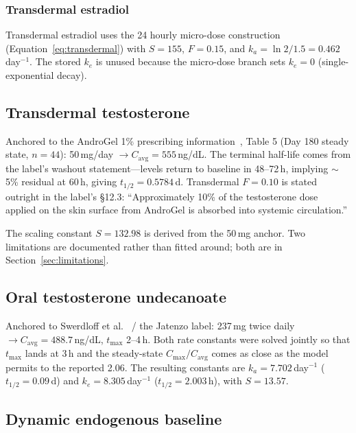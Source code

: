 \documentclass[11pt,a4paper]{article}
\begin{document}
\subsubsection{Transdermal estradiol}

Transdermal estradiol uses the 24 hourly micro-dose construction
(Equation~\ref{eq:transdermal}) with $S = 155$, $F = 0.15$, and $k_a =
\ln 2 / 1.5 = 0.462$\,day$^{-1}$. The stored $k_e$ is unused because the
micro-dose branch sets $k_e = 0$ (single-exponential decay).

\subsection{Transdermal testosterone}
\label{sec:td_t}

Anchored to the AndroGel 1\% prescribing information~\cite{androgel},
Table 5 (Day 180 steady state, $n=44$): 50\,mg/day $\to
C_{\mathrm{avg}} = 555$\,ng/dL. The terminal half-life comes from the
label's washout statement---levels return to baseline in 48--72\,h,
implying $\sim$5\% residual at 60\,h, giving $t_{1/2} = 0.5784$\,d.
Transdermal $F = 0.10$ is stated outright in the label's \S12.3:
``Approximately 10\% of the testosterone dose applied on the skin
surface from AndroGel is absorbed into systemic circulation.''

The scaling constant $S = 132.98$ is derived from the 50\,mg anchor.
Two limitations are documented rather than fitted around; both are in
Section~\ref{sec:limitations}.

\subsection{Oral testosterone undecanoate}
\label{sec:oral_t}

Anchored to Swerdloff et al.~\cite{swerdloff2020} / the Jatenzo label:
237\,mg twice daily $\to C_{\mathrm{avg}} = 488.7$\,ng/dL, $t_{\max}$
2--4\,h. Both rate constants were solved jointly so that $t_{\max}$
lands at 3\,h and the steady-state $C_{\max}/C_{\mathrm{avg}}$ comes as
close as the model permits to the reported 2.06. The resulting constants
are $k_a = 7.702$\,day$^{-1}$ ($t_{1/2} = 0.09$\,d) and $k_e =
8.305$\,day$^{-1}$ ($t_{1/2} = 2.003$\,h), with $S = 13.57$.

\subsection{Dynamic endogenous baseline}
\label{sec:baseline}
\end{document}
